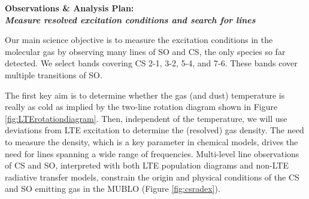 \documentclass[12pt,a4paper]{article}  %
\begin{document}
\vspace{-0.5em}
\begin{center}
\large
\textbf{{Observations \& Analysis Plan:\\ \emph{Measure resolved excitation conditions and search for lines}}}
\end{center} 
\vspace{-0.5em}
Our main science objective is to measure the excitation conditions in the molecular gas by observing many lines of SO and CS, the only species so far detected.
We select bands covering CS 2-1, 3-2, 5-4, and 7-6.
These bands cover multiple transitions of SO.

The first key aim is to determine whether the gas (and dust) temperature is really as cold as implied by the two-line rotation diagram shown in Figure \ref{fig:LTErotationdiagram}.
Then, independent of the temperature, we will use deviations from LTE excitation to determine the (resolved) gas density.
The need to measure the density, which is a key parameter in chemical models, drives the need for lines spanning a wide range of frequencies.
Multi-level line observations of CS and SO, interpreted with both LTE population diagrams and non-LTE radiative transfer models, constrain the origin and physical conditions of the CS and SO emitting gas in the MUBLO (Figure \ref{fig:csradex}).


\end{document}
